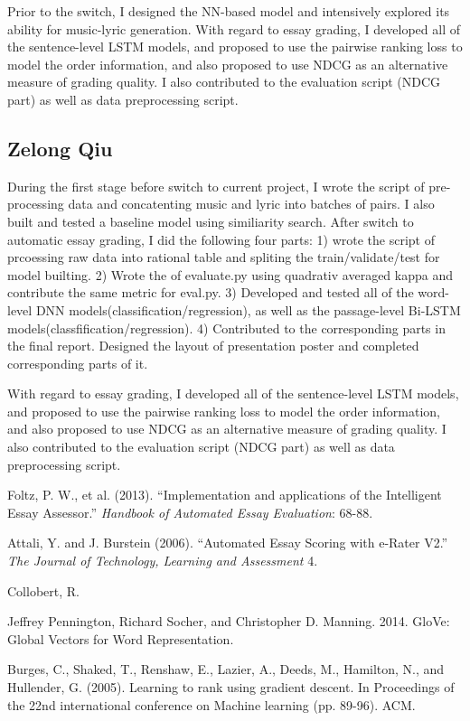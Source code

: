 \documentclass[10pt,psamsfonts]{amsart}
\theoremstyle{definition}
\theoremstyle{remark}
\numberwithin{equation}{section}
\begin{document}
Prior to the switch, I designed the NN-based model and intensively explored its ability for music-lyric generation. With regard to essay grading, I developed all of the sentence-level LSTM models, and proposed to use the pairwise ranking loss to model the order information, and also proposed to use NDCG as an alternative measure of grading quality. I also contributed to the evaluation script (NDCG part) as well as data preprocessing script.

\subsection*{Zelong Qiu}
During the first stage before switch to current project, I wrote the script of pre-processing data and concatenting music and lyric into batches of pairs. I also built and tested a baseline model using similiarity search. After switch to automatic essay grading, I did the following four parts: 1) wrote the script of prcoessing raw data into rational table and spliting the train/validate/test for model builting. 2) Wrote the of evaluate.py using quadrativ averaged kappa and contribute the same metric for eval.py. 3) Developed and tested all of the word-level DNN models(classification/regression), as well as the passage-level Bi-LSTM models(classfification/regression). 4) Contributed to the corresponding parts in the final report. Designed the layout of presentation poster and completed corresponding parts of it.

With regard to essay grading, I developed all of the sentence-level LSTM models, and proposed to use the pairwise ranking loss to model the order information, and also proposed to use NDCG as an alternative measure of grading quality. I also contributed to the evaluation script (NDCG part) as well as data preprocessing script.

\begin{thebibliography}{99}
Foltz, P. W., et al. (2013). ``Implementation and applications of the Intelligent Essay Assessor.'' {\em Handbook of Automated Essay Evaluation}: 68-88.

Attali, Y. and J. Burstein (2006). ``Automated Essay Scoring with e-Rater V2.'' {\em The Journal of Technology, Learning and Assessment} 4.

Collobert, R.

Jeffrey Pennington, Richard Socher, and Christopher D. Manning. 2014. GloVe: Global Vectors for Word Representation.

Burges, C., Shaked, T., Renshaw, E., Lazier, A., Deeds, M., Hamilton, N., and Hullender, G. (2005). Learning to rank using gradient descent. In Proceedings of the 22nd international conference on Machine learning (pp. 89-96). ACM.


\end{thebibliography}
\end{document}
